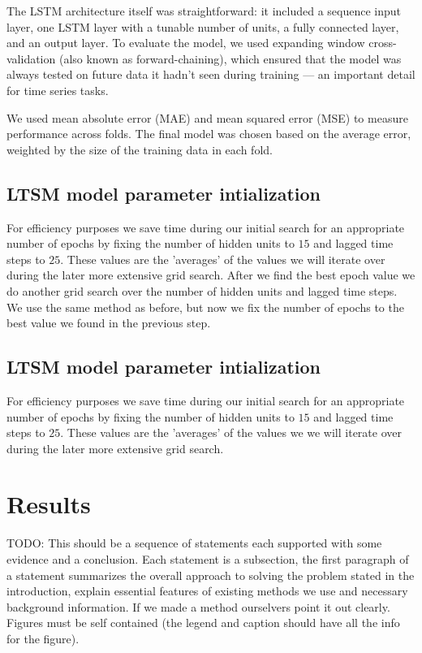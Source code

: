 \documentclass[conference]{IEEEtran}
\begin{document}
The LSTM architecture itself was straightforward: it included a sequence input layer, one LSTM layer with 
a tunable number of units, a fully connected layer, and an output layer. To evaluate the model, we used 
expanding window cross-validation (also known as forward-chaining), which ensured that the model was 
always tested on future data it hadn’t seen during training — an important detail for time series tasks.

We used mean absolute error (MAE) and mean squared error (MSE) to measure performance across folds. The 
final model was chosen based on the average error, weighted by the size of the training data in each fold.

\subsection{LTSM model parameter intialization}
For efficiency purposes we save time during our initial search for an appropriate number of epochs by 
fixing the number of hidden units to $15$ and lagged time steps to $25$. These values are the 'averages'
of the values we will iterate over during the later more extensive grid search. 
After we find the best epoch value we do another grid search over the number of hidden units and lagged
time steps. We use the same method as before, but now we fix the number of epochs to the best value
we found in the previous step. 

\subsection{LTSM model parameter intialization}
For efficiency purposes we save time during our initial search for an appropriate number of epochs by 
fixing the number of hidden units to $15$ and lagged time steps to $25$. These values are the 'averages'
of the values we we will iterate over during the later more extensive grid search. 

\section{Results}
TODO: This should be a sequence of statements each supported with some evidence and a conclusion.
Each statement is a subsection, the first paragraph of a statement summarizes the overall approach 
to solving the problem stated in the introduction, explain essential features of existing methods
we use and necessary background information. If we made a method ourselvers point it out clearly. 
Figures must be self contained (the legend and caption should have all the info for the figure).
\end{document}
